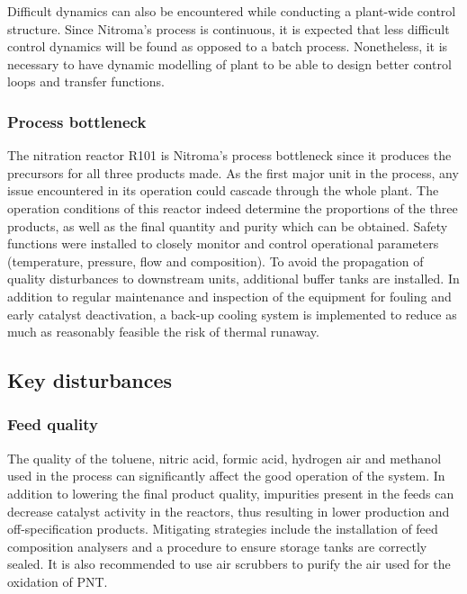 Difficult dynamics can also be encountered while conducting a plant-wide control structure. Since Nitroma's process is continuous, it is expected that less difficult control dynamics will be found as opposed to a batch process. Nonetheless, it is necessary to have dynamic modelling of plant to be able to design better control loops and transfer functions.


\subsubsection{Process bottleneck} %

The nitration reactor R101 is Nitroma's process bottleneck since it produces the precursors for all three products made. As the first major unit in the process, any issue encountered in its operation could cascade through the whole plant. The operation conditions of this reactor indeed determine the proportions of the three products, as well as the final quantity and purity which can be obtained. 	Safety functions were installed to closely monitor and control operational parameters (temperature, pressure, flow and composition). To avoid the propagation of quality disturbances to downstream units, additional buffer tanks are installed. In addition to regular maintenance and inspection of the equipment for fouling and early catalyst deactivation, a back-up cooling system is implemented to reduce as much as reasonably feasible the risk of thermal runaway.


\subsection{Key disturbances} %

\subsubsection{Feed quality}
The quality of the toluene, nitric acid, formic acid, hydrogen air and methanol used in the process can significantly affect the good operation of the system. In addition to lowering the final product quality, impurities present in the feeds can decrease catalyst activity in the reactors, thus resulting in lower production and off-specification products. Mitigating strategies include the installation of feed composition analysers and a procedure to ensure storage tanks are correctly sealed. It is also recommended to use air scrubbers to purify the air used for the oxidation of PNT.

